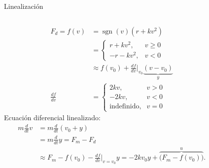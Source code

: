 \documentclass[dvisvgm,hypertex,aspectratio=169]{beamer}
\DeclareMathOperator{\sign}{sgn}
\begin{document}
\begin{frame}[label=L2A]{Linealización}
  \small
  \begin{columns}
    \begin{column}{0.6\columnwidth}
      \begin{align*}
        F_d=f(v) &= \sign(v)(r + kv^2) \\&= \begin{cases} r + kv^2, & v\ge 0\\-r-kv^2, & v<0 \end{cases}\\
             &\approx f(v_0) + \frac{df}{dv}\big|_{v_0}\underbrace{(v - v_0)}_y\\
        \frac{df}{dv} &= \begin{cases} 2kv, & v>0\\-2kv, & v<0\\\text{indefinido}, & v=0 \end{cases}
      \end{align*}
      Ecuación diferencial linealizado:
      \begin{align*}
        m\frac{d}{dt} v &= m\frac{d}{dt} (v_0 + y)\\ &= m\frac{d}{dt} y = F_m - F_d\\
        &\approx F_m - f(v_0) - \frac{df}{dv}\Big|_{v=v_0} y
        = -2kv_0y + \overbrace{\big(F_m - f(v_0)\big)}^u.
      \end{align*}
    \end{column}

    \begin{column}{0.4\columnwidth}
    \begin{center}
    \begin{animateinline}{2}
    \end{animateinline}
  \end{center}
\end{column} 
\end{columns}
\end{frame}
\end{document}
